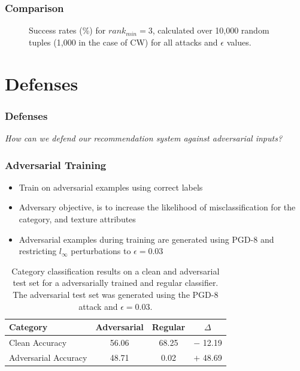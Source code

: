 \documentclass{beamer}
\begin{document}
	\begin{frame}
		\frametitle{Comparison}
		\begin{figure}[H]
			\centering
			\resizebox{\textwidth}{!}{}
			\caption{Success rates (\%) for $rank_{min}=3$, calculated over 10,000 random tuples (1,000 in the case of CW) for all attacks and $\epsilon$ values.}
			\label{fig:top3-normal-success}
		\end{figure}
	\end{frame}
	
	\section{Defenses}
	\begin{frame}
		\frametitle{Defenses}
		\begin{center}
			\huge \textit{How can we defend our recommendation system against adversarial inputs?}
		\end{center} 
	\end{frame}
	
	\begin{frame}
		\frametitle{Adversarial Training}
		\begin{itemize}
			\item Train on adversarial examples using correct labels
			\item Adversary objective, is to increase the likelihood of misclassification for the category, and texture attributes
			\item Adversarial examples during training are generated using PGD-8 and restricting $l_\infty$ perturbations to $\epsilon=0.03$
		\end{itemize}
		\begin{table}[H]
			\centering
			\label{tab:adv-category-results}
			\begin{tabular}{ lccc } 
				\toprule		
				Category        	 & Adversarial & Regular & $\Delta$\\
				\midrule
				Clean Accuracy	     & 56.06 & 68.25 & $-$ 12.19 \\
				Adversarial Accuracy & 48.71 & 0.02  & $+$ 48.69  \\
				\bottomrule
			\end{tabular}
			\caption{Category classification results on a clean and adversarial test set for a adversarially trained and regular classifier. The adversarial test set was generated using the PGD-8 attack and $\epsilon=0.03$.}
		\end{table}
	\end{frame}
	
\end{document}
